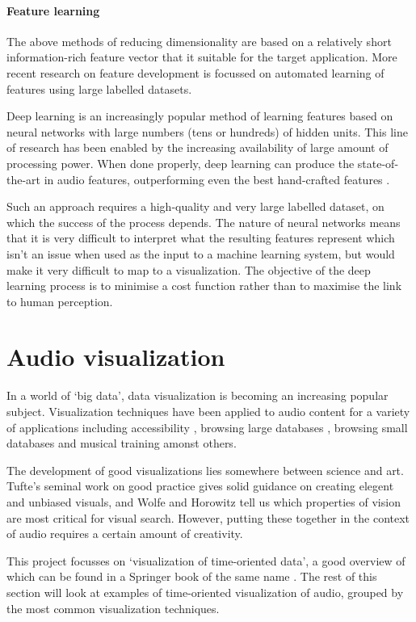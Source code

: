 \paragraph{Feature learning}
The above methods of reducing dimensionality are based on a relatively short
information-rich feature vector that it suitable for the target application.
More recent research on feature development is focussed on automated learning
of features using large labelled datasets.

Deep learning is an increasingly popular method of learning features based on
neural networks with large numbers (tens or hundreds) of hidden units. This
line of research has been enabled by the increasing availability of large
amount of processing power. When done properly, deep learning can produce the
state-of-the-art in audio features, outperforming even the best hand-crafted
features \cite{Hamel2010,Sigtia2014}.

Such an approach requires a high-quality and very large labelled dataset, on
which the success of the process depends. The nature of neural networks means
that it is very difficult to interpret what the resulting features represent
which isn't an issue when used as the input to a machine learning system, but
would make it very difficult to map to a visualization. The objective of the
deep learning process is to minimise a cost function rather than to maximise
the link to human perception.

\section{Audio visualization}
In a world of `big data', data visualization is becoming an increasing popular
subject. Visualization techniques have been applied to audio content for a
variety of applications including accessibility \cite{Ho-Ching2003}, browsing
large databases \cite{FontCorbera2010}, browsing small databases \cite{Yoo2011}
and musical training \cite{Ferguson2005} amonst others.

The development of good visualizations lies somewhere between science and art.
Tufte's seminal work on good practice \cite{Tufte2001} gives solid guidance on
creating elegent and unbiased visuals, and Wolfe and Horowitz \cite{Wolfe2004}
tell us which properties of vision are most critical for visual search.
However, putting these together in the context of audio requires a certain
amount of creativity.

This project focusses on `visualization of time-oriented data', a good overview
of which can be found in a Springer book of the same name \cite{Aigner2011}.
The rest of this section will look at examples of time-oriented visualization
of audio, grouped by the most common visualization techniques.

